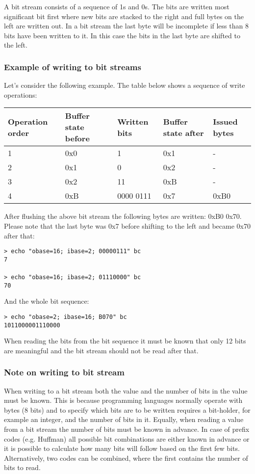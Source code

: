 \documentclass[a4paper]{article}
\begin{document}
A bit stream consists of a sequence of 1s and 0s. The bits are written most significant 
bit first where new bits are stacked to the right and full bytes on the left are 
written out. In a bit stream the last byte will be incomplete if less than 8 bits 
have been written to it. In this case the bits in the last byte are shifted to 
the left.

\subsubsection*{Example of writing to bit streams}

Let's consider the following example. The table below shows a sequence of write 
operations: 

\begin{tabular}{|l|l|l|l|l|}
\hline
\textbf{Operation order} & \textbf{Buffer state before} & \textbf{Written bits} & \textbf{Buffer state after} & \textbf{Issued bytes}\tabularnewline
\hline
1 & 0x0 & 1 & 0x1 & -\tabularnewline
\hline
2 & 0x1 & 0 & 0x2 & -\tabularnewline
\hline
3 & 0x2 & 11 & 0xB & -\tabularnewline
\hline
4 & 0xB & 0000 0111 & 0x7 & 0xB0\tabularnewline
\hline
\end{tabular}

After flushing the above bit stream the following bytes are written: 0xB0 0x70. 
Please note that the last byte was 0x7 before shifting to the left and became 0x70 
after that:

\texttt{> echo "obase=16; ibase=2; 00000111" \textbar{} bc\\
7\\
\\
> echo "obase=16; ibase=2; 01110000" \textbar{} bc\\
70}

And the whole bit sequence: 

\texttt{> echo "obase=2; ibase=16; B070" \textbar{} bc\\
1011000001110000}

When reading the bits from the bit sequence it must be known that only 12 bits 
are meaningful and the bit stream should not be read after that. 

\subsubsection*{Note on writing to bit stream}

When writing to a bit stream both the value and the number of bits in the value 
must be known. This is because programming languages normally operate with bytes 
(8 bits) and to specify which bits are to be written requires a bit-holder, for 
example an integer, and the number of bits in it. Equally, when reading a value 
from a bit stream the number of bits must be known in advance. In case of prefix 
codes (e.g. Huffman) all possible bit combinations are either known in advance 
or it is possible to calculate how many bits will follow based on the first few 
bits. Alternatively, two codes can be combined, where the first contains the number 
of bits to read. 
\end{document}
